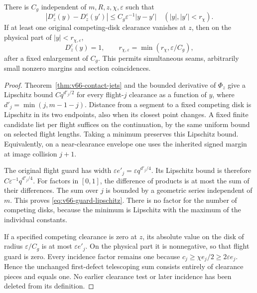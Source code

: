\begin{lemma}
\label{lem:v66-uniform-guard}
There is $C_g$ independent of $m,R,z,\chi,\varepsilon$ such that
\begin{equation}\label{eq:v66-guard-lipschitz}
 |D_z^\varepsilon(y)-D_z^\varepsilon(y')|
                \le C_g\varepsilon^{-1}|y-y'|
                  \quad (|y|,|y'|<r_\chi).
\end{equation}
If at least one original competing-disk clearance vanishes at $z$,
then on the physical part of $|y|<r_{\chi,\varepsilon}$,
\begin{equation}\label{eq:v66-seam-saturation}
 D_z^\varepsilon(y)=1,\qquad
 r_{\chi,\varepsilon}=
             \min(r_\chi,\varepsilon/C_g),
\end{equation}
after a fixed enlargement of $C_g$. This permits simultaneous seams,
arbitrarily small nonzero margins and section coincidences.
\end{lemma}
\begin{proof}
Theorem~\ref{thm:v66-contact-jets} and the bounded derivative of
$\Phi_z$ give a Lipschitz bound $Cq^{d'_j/2}$ for every flight-$j$
clearance as a function of $y$, where $d'_j=\min(j,m-1-j)$.
Distance from a segment to a fixed competing disk is Lipschitz in
its two endpoints, also when its closest point changes. A fixed finite
candidate list per flight suffices on the continuation, by the same
uniform bound on selected flight lengths. Taking a minimum preserves
this Lipschitz bound. Equivalently, on a near-clearance envelope one
uses the inherited signed margin at image collision $j+1$.

The original flight guard has width
$\varepsilon e'_j=\varepsilon q^{d'_j/4}$. Its Lipschitz bound is
therefore $C\varepsilon^{-1}q^{d'_j/4}$. For factors in $[0,1]$,
the difference of products is at most the sum of their differences.
The sum over $j$ is bounded by a geometric series independent of $m$.
This proves \eqref{eq:v66-guard-lipschitz}. There is no factor for
the number of competing disks, because the minimum is Lipschitz with
the maximum of the individual constants.

If a specified competing clearance is zero at $z$, its absolute value
on the disk of radius $\varepsilon/C_g$ is at most
$\varepsilon e'_j$. On the physical part it is nonnegative, so that
flight guard is zero. Every incidence factor remains one because
$c_j\ge\chi e_j/2\ge2\varepsilon e_j$. Hence the unchanged
first-defect telescoping sum consists entirely of clearance pieces
and equals one. No earlier clearance test or later incidence has been
deleted from its definition.
\end{proof}

